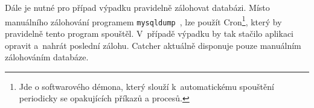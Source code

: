 Dále je nutné pro případ výpadku pravidelně zálohovat databázi. Místo manuálního zálohování programem
\texttt{mysqldump}~\cite{mysqldump}, lze použít Cron\footnote{Jde o softwarového démona, který slouží
k~automatickému spouštění periodicky se opakujících příkazů a procesů.}, který by pravidelně tento program spouštěl. 
V~případě výpadku by tak stačilo aplikaci opravit a~nahrát poslední zálohu.
Catcher aktuálně disponuje pouze manuálním zálohováním databáze.




